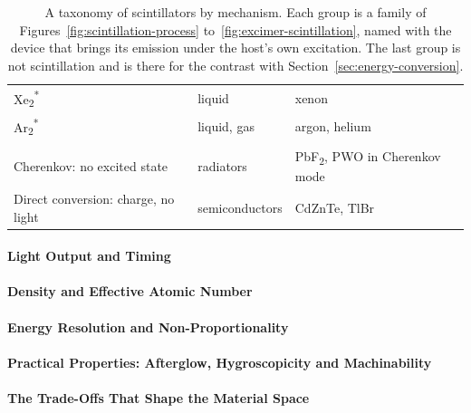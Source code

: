 \begin{table}[tbp]
\begin{tabularx}{\textwidth}{@{} >{\raggedright\arraybackslash}p{4.9cm} >{\raggedright\arraybackslash}p{4.0cm} >{\raggedright\arraybackslash}X @{}}
		Xe\textsubscript{2}\textsuperscript{*} & liquid & xenon \\
		\addlinespace[3pt]
		Ar\textsubscript{2}\textsuperscript{*} & liquid, gas & argon, helium \\
		\midrule
		\multicolumn{3}{@{}l@{}}{\textbf{Not scintillation}, for contrast} \\
		\addlinespace[3pt]
		Cherenkov: no excited state & radiators & PbF\textsubscript{2}, PWO in Cherenkov mode \\
		\addlinespace[3pt]
		Direct conversion: charge, no light & semiconductors & CdZnTe, TlBr \\
		\bottomrule
	\end{tabularx}
	\caption[A taxonomy of scintillators by mechanism]{%
		A taxonomy of scintillators by mechanism.
		Each group is a family of Figures~\ref{fig:scintillation-process} to~\ref{fig:excimer-scintillation}, named with the device that brings its emission under the host's own excitation.
The last group is not scintillation and is there for the contrast with Section~\ref{sec:energy-conversion}.
	}
	\label{tab:scintillator-taxonomy}
\end{table}

\paragraph{Light Output and Timing}

\paragraph{Density and Effective Atomic Number}

\paragraph{Energy Resolution and Non-Proportionality}

\paragraph{Practical Properties: Afterglow, Hygroscopicity and Machinability}

\paragraph{The Trade-Offs That Shape the Material Space}

